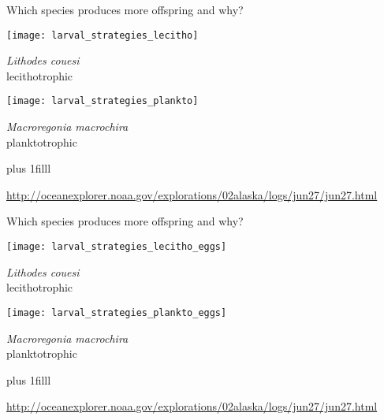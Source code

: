 \documentclass[t,handout]{beamer}  %
\begin{document}
\begin{frame}[t]{Which species produces more offspring and why?}
	\begin{multicols}{2}

	\begin{center}
		\texttt{[image: larval\_strategies\_lecitho]}
		
		\textit{Lithodes couesi}\\
		lecithotrophic

	\end{center}	
	\columnbreak

	\begin{center}	
		\texttt{[image: larval\_strategies\_plankto]}

		\textit{Macroregonia macrochira}\\
		planktotrophic
	\end{center}
	\end{multicols}
	
	\vspace*{-\baselineskip}
	
	
	\vskip0pt plus 1filll
	
	\tiny \url{http://oceanexplorer.noaa.gov/explorations/02alaska/logs/jun27/jun27.html}
\end{frame}

\begin{frame}[t]{Which species produces more offspring and why?}
	\begin{multicols}{2}

	\begin{center}
		\texttt{[image: larval\_strategies\_lecitho\_eggs]}
		
		\textit{Lithodes couesi}\\
		lecithotrophic

	\end{center}	
	\columnbreak

	\begin{center}	
		\texttt{[image: larval\_strategies\_plankto\_eggs]}

		\textit{Macroregonia macrochira}\\
		planktotrophic
	\end{center}
	\end{multicols}
	
	
	\vskip0pt plus 1filll
	
	\tiny \url{http://oceanexplorer.noaa.gov/explorations/02alaska/logs/jun27/jun27.html}
\end{frame}
\end{document}
